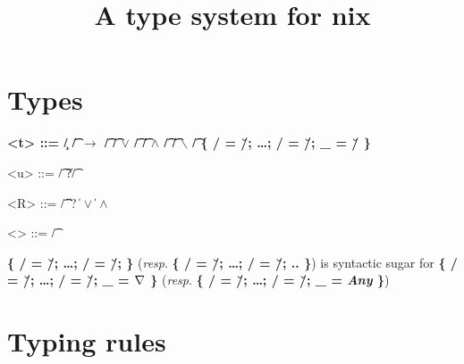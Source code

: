 

\title{A type system for nix}



\maketitle{}

\section{Types}
\begin{grammar}
  \bfseries
  <t> ::= \c/ \| \t/ $\bm{\rightarrow}$ \t/
    \alt \t/ $\bm{\vee}$ \t/ \| \t/ $\bm{\wedge}$ \t/ \| \t/ $\bm{\backslash}$ \t/
    \alt [\meta{R}]
    \alt \{ \s/ = \u/; \ldots{}; \s/ = \u/; _ = \u/ \}

  <u> ::= \t/ \| ?\t/

  <R> ::= \t/ \|  \| ?
    \|  $\bm{\vee}$  \|  $\bm{\wedge}$ 

  <\τ> ::= \t/ %
\end{grammar}

\textbf{\{ \s/ = \u/; \ldots{}; \s/ = \u/; \}} (\emph{resp}. \textbf{\{ \s/ =
\u/; \ldots{}; \s/ = \u/; .. \}}) is syntactic sugar for \textbf{\{ \s/ = \u/;
\ldots{}; \s/ = \u/; _ = $\nabla$ \}} (\emph{resp}. \textbf{\{ \s/ = \u/;
\ldots{}; \s/ = \u/; _ = \textmd{\emph{Any}} \}})

\section{Typing rules}
